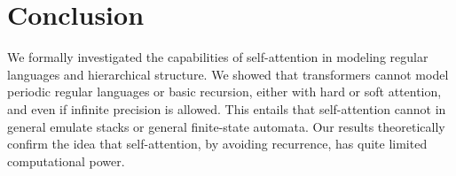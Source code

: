 \documentclass[11pt,a4paper]{article}
\begin{document}






\section{Conclusion}
We formally investigated the capabilities of self-attention in modeling regular languages and hierarchical structure.
We showed that transformers cannot model periodic regular languages or basic recursion, either with hard or soft attention, and even if infinite precision is allowed. %
This entails that self-attention cannot in general emulate stacks or general finite-state automata.
Our results theoretically confirm the idea that self-attention, by avoiding recurrence, has quite limited computational power.





\end{document}
